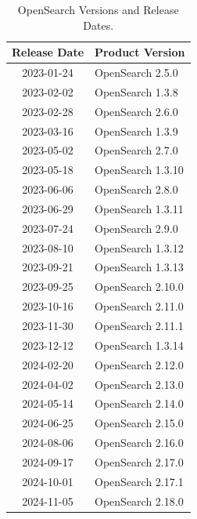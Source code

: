 \documentclass[../main.tex]{subfiles}
\begin{document}

\begin{table}[H]
\centering
\begin{tabular}{|c|l|}
\hline
\textbf{Release Date} & \textbf{Product Version} \\ \hline
    2023-01-24 & OpenSearch 2.5.0 \\ \hline  
    2023-02-02 & OpenSearch 1.3.8 \\ \hline  
    2023-02-28 & OpenSearch 2.6.0 \\ \hline  
    2023-03-16 & OpenSearch 1.3.9 \\ \hline  
    2023-05-02 & OpenSearch 2.7.0 \\ \hline  
    2023-05-18 & OpenSearch 1.3.10 \\ \hline  
    2023-06-06 & OpenSearch 2.8.0 \\ \hline  
    2023-06-29 & OpenSearch 1.3.11 \\ \hline  
    2023-07-24 & OpenSearch 2.9.0 \\ \hline  
    2023-08-10 & OpenSearch 1.3.12 \\ \hline  
    2023-09-21 & OpenSearch 1.3.13 \\ \hline  
    2023-09-25 & OpenSearch 2.10.0 \\ \hline  
    2023-10-16 & OpenSearch 2.11.0 \\ \hline  
    2023-11-30 & OpenSearch 2.11.1 \\ \hline  
    2023-12-12 & OpenSearch 1.3.14 \\ \hline  
    2024-02-20 & OpenSearch 2.12.0 \\ \hline  
    2024-04-02 & OpenSearch 2.13.0 \\ \hline  
    2024-05-14 & OpenSearch 2.14.0 \\ \hline  
    2024-06-25 & OpenSearch 2.15.0 \\ \hline  
    2024-08-06 & OpenSearch 2.16.0 \\ \hline  
    2024-09-17 & OpenSearch 2.17.0 \\ \hline  
    2024-10-01 & OpenSearch 2.17.1 \\ \hline  
    2024-11-05 & OpenSearch 2.18.0 \\ \hline
\end{tabular}
\caption{OpenSearch Versions and Release Dates. \protect\footnotemark}
\label{table:opensearch_versions}
\end{table}
\end{document}
